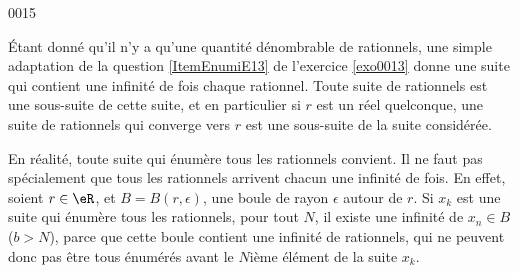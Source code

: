 
\begin{corrige}{0015}

Étant donné qu'il n'y a qu'une quantité dénombrable de rationnels, une simple adaptation de la question \ref{ItemEnumiE13} de l'exercice \ref{exo0013} donne une suite qui contient une infinité de fois chaque rationnel. Toute suite de rationnels est une sous-suite de cette suite, et en particulier si $r$ est un réel quelconque, une suite de rationnels qui converge vers $r$ est une sous-suite de la suite considérée.

\begin{alternative}
En réalité, toute suite qui énumère tous les rationnels convient. Il ne faut pas spécialement que tous les rationnels arrivent chacun une infinité de fois. En effet, soient $r\in\eR$, et $B=B(r,\epsilon)$, une boule de rayon $\epsilon$ autour de $r$. Si $x_k$ est une suite qui énumère tous les rationnels, pour tout $N$, il existe une infinité de $x_n\in B$ ($b>N$), parce que cette boule contient une infinité de rationnels, qui ne peuvent donc pas être tous énumérés avant le $N$ième élément de la suite $x_k$.
\end{alternative}

\end{corrige}
